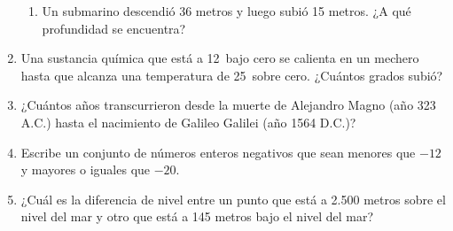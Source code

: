 \documentclass[letterpaper,fleqn]{article}
\begin{document}
\begin{enumerate}
\begin{enumerate}
  \item Un submarino descendió 36 metros y luego subió 15 metros. ¿A qué profundidad se encuentra?\noanswer[.25in]
\end{enumerate}
\item Una sustancia química que está a 12\textcelsius \, bajo cero se calienta en un mechero hasta que alcanza una temperatura de 25\textcelsius \, sobre cero. ¿Cuántos grados subió? \noanswer
\item ¿Cuántos años transcurrieron desde la muerte de Alejandro Magno (año 323 A.C.) hasta el nacimiento de Galileo Galilei (año 1564 D.C.)? \noanswer
\item Escribe un conjunto de números enteros negativos que sean menores que $-12$ y mayores o iguales que $-20$.\noanswer
\item ¿Cuál es la diferencia de nivel entre un punto que está a 2.500 metros sobre el nivel del mar y otro que está a 145 metros bajo el nivel del mar? \noanswer
 \end{enumerate}
\end{document}
